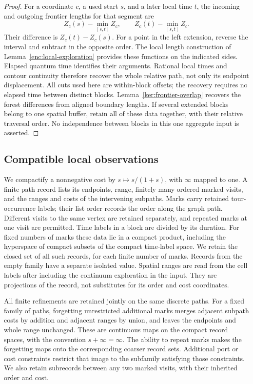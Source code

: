 \begin{proof}
For a coordinate $c$, a used start $s$, and a later local time $t$,
the incoming and outgoing frontier lengths for that segment are
\[
 Z_c(s)-\min_{[s,t]}Z_c,
 \qquad Z_c(t)-\min_{[s,t]}Z_c.
\]
Their difference is $Z_c(t)-Z_c(s)$.  For a point in the left
extension, reverse the interval and subtract in the opposite order.
The local length construction of Lemma~\ref{enc:local-exploration}
provides these functions on the indicated sides.  Elapsed quantum
time identifies their arguments.  Rational local times and contour
continuity therefore recover the whole relative path, not only its
endpoint displacement.  All cuts used here are within-block offsets;
the recovery requires no elapsed time between distinct blocks.
Lemma~\ref{ker:frontier-overlap} recovers the
forest differences from aligned boundary lengths.  If several
extended blocks belong to one spatial buffer, retain all of these
data together, with their relative traversal order.  No independence
between blocks in this one aggregate input is asserted.
\end{proof}

\subsection{Compatible local observations}

We compactify a nonnegative cost by \(s\mapsto s/(1+s)\), with
\(\infty\) mapped to one.  A finite path record lists its endpoints,
range, finitely many ordered marked visits, and the ranges and costs
of the intervening subpaths.  Marks carry retained tour-occurrence
labels; their list order records the order along the graph path.
Different visits to the same vertex are retained separately, and
repeated marks at one visit are permitted.  Time labels in a block
are divided by its duration.  For
fixed numbers of marks these data lie in a compact product, including
the hyperspace of compact subsets of the compact time-label space.
We retain the closed set of all such records, for each finite number
of marks.  Records from the empty family have a separate isolated
value.  Spatial ranges are read from the cell labels after including
the continuum exploration in the input.  They are projections of
the record, not substitutes for its order and cost coordinates.

All finite refinements are retained jointly on the same discrete
paths.  For a fixed family of paths, forgetting unrestricted
additional marks merges adjacent subpath costs by
addition and adjacent ranges by union, and leaves the endpoints and
whole range unchanged.  These are continuous maps on the compact
record spaces, with the convention $s+\infty=\infty$.
The ability to repeat marks makes the forgetting maps onto the
corresponding coarser record sets.  Additional port or cost constraints
restrict that image to the subfamily satisfying those constraints.
We also retain subrecords between
any two marked visits, with their inherited order and cost.

